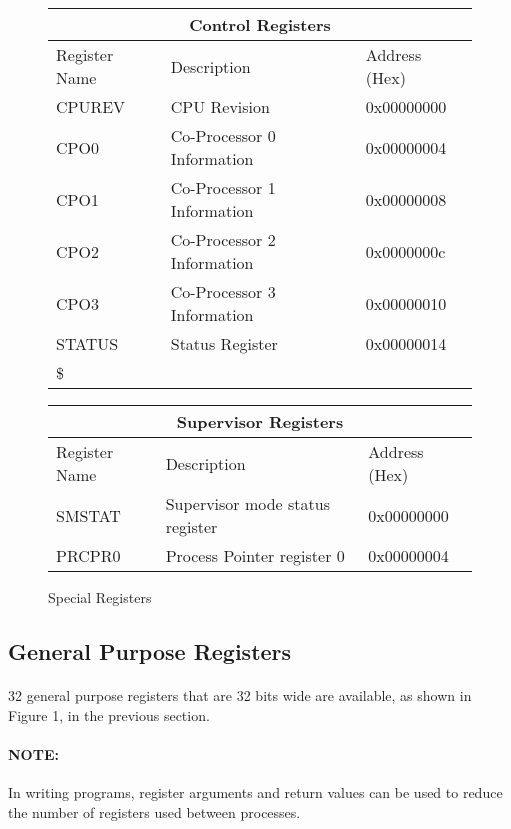 \documentclass[letterpaper, 11pt]{article}
\begin{document}
	\begin{figure}
		\caption{Special Registers}
		\parbox{0\linewidth}{
			\centering
			\fontsize{6}{8}\selectfont
			\begin{tabular}{|l|l|l|}
				\hline
				\multicolumn{3}{|c|}{Control Registers} \\
				\hline
					Register Name & Description & Address (Hex) \\ \hline
					CPUREV  & CPU Revision 							& 0x00000000\\ 	\hline
					CPO0  	& Co-Processor 0 Information 			& 0x00000004\\ 	\hline
					CPO1  	& Co-Processor 1 Information 			& 0x00000008\\ 	\hline
					CPO2  	& Co-Processor 2 Information 			& 0x0000000c\\ 	\hline
					CPO3  	& Co-Processor 3 Information 			& 0x00000010\\ 	\hline
					STATUS  & Status Register						& 0x00000014 \\ 	\hline
					\$
			\end{tabular}
		}
		\hfill
		\parbox{0.4 \linewidth}{
			\centering
			\fontsize{6}{8}\selectfont
			\begin{tabular}{|l|l|l|}
				\hline
				\multicolumn{3}{|c|}{Supervisor Registers} \\
				\hline
					Register Name & Description & Address (Hex)\\ \hline
					SMSTAT & Supervisor mode status register & 0x00000000 \\ 	\hline
				    PRCPR0 & Process Pointer register 0 & 0x00000004	\\ \hline 
			\end{tabular}
		}
	\end{figure}
\subsection{General Purpose Registers}
\paragraph{}32 general purpose registers that are 32 bits wide are available, as shown in Figure 1, in the previous section. 
	

\paragraph{NOTE:} In writing programs, register arguments and return values can be used to reduce the number of registers used between processes. 
\end{document}
